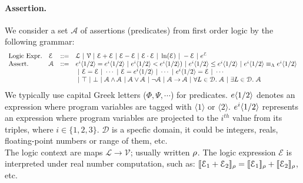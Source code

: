 \documentclass[a4paper,11pt]{article}
\begin{document}
\paragraph{Assertion.} We consider a set $\mathcal{A}$ of assertions (predicates) from first order logic by the following grammar:
\[
\begin{array}{llll}
%
%
\mbox{Logic Expr.} & \mathcal{E} & ::= & \mathcal{L}
	~|~ \mathcal{V}
 	~|~ \mathcal{E} + \mathcal{E}
 ~|~ \mathcal{E} - \mathcal{E}
 ~|~ \mathcal{E} \cdot \mathcal{E}
 ~|~ \ln(\mathcal{E}) ~|~ -\mathcal{E} ~|~ e^{\mathcal{E}}
	\\
%
\mbox{Assert.} & \mathcal{A} & ::= & 
\expr^{i} \langle 1 / 2 \rangle = \expr^i\langle 1 / 2 \rangle 
 ~|~ \expr^i\langle 1 / 2 \rangle < \expr^i\langle 1 / 2 \rangle) 
 ~|~ \expr^i\langle 1 / 2 \rangle \leq \expr^i\langle 1 / 2 \rangle
 ~|~ \expr^i\langle 1 / 2 \rangle \lameq \expr^i\langle 1 / 2 \rangle
	\\
 & & &
~|~  \mathcal{E} = \mathcal{E} ~|~ \cdots
~|~ \mathcal{E} =  \expr^{i} \langle 1 / 2 \rangle ~|~ \cdots
~|~ \expr^{i} \langle 1 / 2 \rangle =  \mathcal{E} ~|~ \cdots
	\\
 & & &
~|~  \top ~|~ \bot
	~|~ \mathcal{A} \land \mathcal{A} ~|~ \mathcal{A} \lor \mathcal{A} ~|~ \neg \mathcal{A}
	~|~ \mathcal{A} \imply \mathcal{A}
	~|~ \forall L \in \mathcal{D}. ~ \mathcal{A}
	~|~ \exists L \in \mathcal{D}. ~ \mathcal{A}
\end{array}
\]
%
We typically use capital Greek letters ($\Phi, \Psi, \cdots$) for predicates. 
%
$e\langle 1 / 2 \rangle$ denotes an expression where program variables are tagged with $\langle 1 \rangle$ or $\langle 2 \rangle$.
%
$e^i\langle 1 / 2 \rangle$ represents an expression where program variables are projected to the $i^{th}$ value from its triples, where $i \in \{1, 2, 3\}$. $\mathcal{D}$ is a specfic domain, it could be integers, reals, floating-point numbers or range of them, etc.
\\
The logic context are maps $\mathcal{L} \to \mathcal{V}$; usually written $\mathtt{\rho}$. The logic expression $\mathcal{E}$ is interpreted under real number computation, such as:
%
$\llbracket \mathcal{E}_1 + \mathcal{E}_2 \rrbracket_{\mathtt{\rho}} = \llbracket \mathcal{E}_1 \rrbracket_{\mathtt{\rho}} + \llbracket \mathcal{E}_2 \rrbracket_{\mathtt{\rho}}$, etc.
%
%
\end{document}
